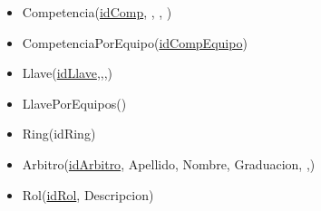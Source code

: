\begin{itemize}
\item Competencia(\underline{idComp}, , , )

\item CompetenciaPorEquipo(\underline{idCompEquipo})

\item Llave(\underline{idLlave},,,)

\item LlavePorEquipos()

\item Ring(idRing)

\item Arbitro(\underline{idArbitro}, Apellido, Nombre, Graduacion,  ,)\\


\item Rol(\underline{idRol}, Descripcion)




\end{itemize}

